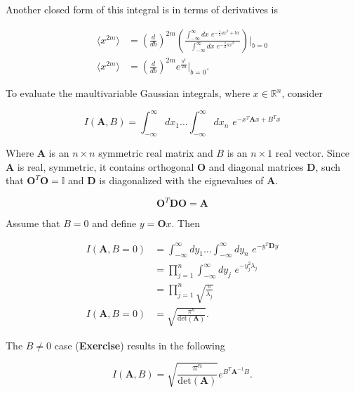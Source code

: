 \noindent Another closed form of this integral is in terms of derivatives is

\begin{align}
\langle x^{2m} \rangle &=  \left( \frac{d}{db} \right)^{2m} \left(  \frac{\int_{-\infty}^\infty dx \,\, e^{ -\frac{1}{2} a x^2 + b x }}{\int_{-\infty}^\infty dx \,\, e^{ -\frac{1}{2} a x^2 }} \right) \big|_{b=0} \\
\langle x^{2m} \rangle &= \left( \frac{d}{db} \right)^{2m} e^{\frac{b^2}{2a}} \big|_{b=0}.
\end{align}

\noindent To evaluate the maultivariable Gaussian integrals, where $x \in \mathbb{R}^n$, consider

\begin{equation}
I(\textbf{A}, B) = \int_{-\infty}^\infty dx_1 \dots \int_{-\infty}^\infty dx_n \,\, e^{-x^T \textbf{A} x + B^T x}
\end{equation}

\noindent Where $\textbf{A}$ is an $n \times n$ symmetric real matrix and $B$ is an $n \times 1$ real vector. Since $\textbf{A}$ is real, symmetric, it contains orthogonal $\textbf{O}$ and diagonal matrices $\textbf{D}$, such that $\textbf{O}^T \textbf{O} = \mathbb{I}$ and $\textbf{D}$ is diagonalized with the eignevalues of $\textbf{A}$.

\begin{equation}
\textbf{O}^T \textbf{D} \textbf{O} = \textbf{A}
\end{equation}

\noindent Assume that $B=0$ and define $y = \textbf{O} x$. Then

\begin{align}
I(\textbf{A}, B=0) &= \int_{-\infty}^\infty dy_1 \dots \int_{-\infty}^\infty dy_n \,\, e^{-y^T \textbf{D} y} \\
&= \prod_{j=1}^n \int_{-\infty}^\infty dy_j \,\, e^{-y_j^2 \lambda_j} \\
&= \prod_{j=1}^n \sqrt{\frac{\pi}{\lambda_j}} \\
I(\textbf{A}, B=0)&= \sqrt{\frac{\pi^n}{\text{det}(\textbf{A})}}.
\end{align}

\noindent The $B \ne 0$ case (\textbf{Exercise}) results in the following

\begin{equation}
I(\textbf{A},B) = \sqrt{\frac{\pi^n}{\text{det}(\textbf{A})}} e^{B^T \textbf{A}^{-1} B}.
\end{equation}